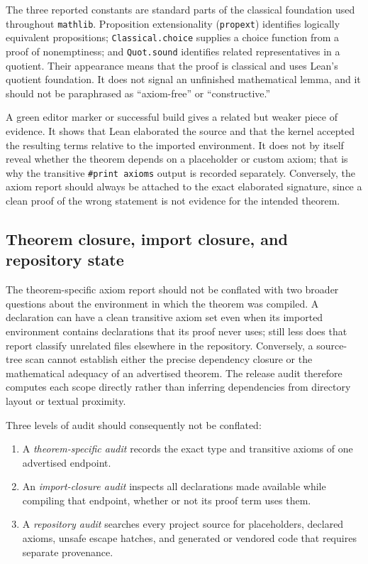 \documentclass[11pt]{article}
\theoremstyle{plain}
\theoremstyle{definition}
\theoremstyle{remark}
\begin{document}
The three reported constants are standard parts of the classical foundation
used throughout \texttt{mathlib}.  Proposition extensionality
(\texttt{propext}) identifies logically equivalent propositions;
\texttt{Classical.choice} supplies a choice function from a proof of
nonemptiness; and \texttt{Quot.sound} identifies related representatives in a
quotient.  Their appearance means that the proof is classical and uses Lean's
quotient foundation.  It does not signal an unfinished mathematical lemma,
and it should not be paraphrased as ``axiom-free'' or ``constructive.''

A green editor marker or successful build gives a related but weaker piece of
evidence.  It shows that Lean elaborated the source and that the kernel accepted
the resulting terms relative to the imported environment.  It does not by
itself reveal whether the theorem depends on a placeholder or custom axiom;
that is why the transitive \texttt{\#print axioms} output is recorded
separately.  Conversely, the axiom report should always be attached to the
exact elaborated signature, since a clean proof of the wrong statement is not
evidence for the intended theorem.

\subsection{Theorem closure, import closure, and repository state}

The theorem-specific axiom report should not be conflated with two broader
questions about the environment in which the theorem was compiled.  A
declaration can have a clean transitive axiom set even when its imported
environment contains declarations that its proof never uses; still less does
that report classify unrelated files elsewhere in the repository.  Conversely,
a source-tree scan cannot establish either the precise dependency closure or
the mathematical adequacy of an advertised theorem.  The release audit
therefore computes each scope directly rather than inferring dependencies from
directory layout or textual proximity.

Three levels of audit should consequently not be conflated:

\begin{enumerate}[leftmargin=2em]
  \item A \emph{theorem-specific audit} records the exact type and transitive
  axioms of one advertised endpoint.
  \item An \emph{import-closure audit} inspects all declarations made available
  while compiling that endpoint, whether or not its proof term uses them.
  \item A \emph{repository audit} searches every project source for
  placeholders, declared axioms, unsafe escape hatches, and generated or
  vendored code that requires separate provenance.
\end{enumerate}
\end{document}
